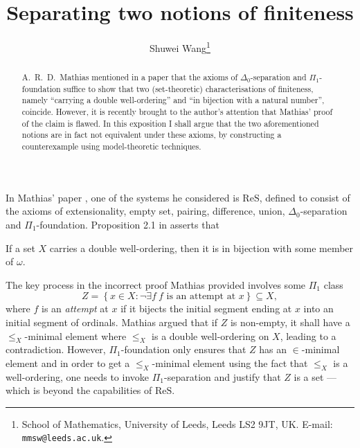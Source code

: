 \documentclass[11pt]{article}
\title{Separating two notions of finiteness}
\author{Shuwei Wang\footnote{School of Mathematics, University of Leeds, Leeds LS2 9JT, UK. E-mail: \texttt{mmsw@leeds.ac.uk}.}}
\date{\DTMdate{2023-10-25}}
\theoremstyle{plain}
\theoremstyle{definition}
\newcommand{\ReS}{\mathrm{ReS}}
\begin{document}
\maketitle

\begin{abstract}
  A.\ R.\ D.\ Mathias mentioned in a paper that the axioms of $\Delta_0$-separation and $\Pi_1$-foundation suffice to show that two (set-theoretic) characterisations of finiteness, namely ``carrying a double well-ordering'' and ``in bijection with a natural number'', coincide. However, it is recently brought to the author's attention that Mathias' proof of the claim is flawed. In this exposition I shall argue that the two aforementioned notions are in fact not equivalent under these axioms, by constructing a counterexample using model-theoretic techniques.
\end{abstract}

In Mathias' paper \cite{mathias06-weak-systems}, one of the systems he considered is $\ReS$, defined to consist of the axioms of extensionality, empty set, pairing, difference, union, $\Delta_0$-separation and $\Pi_1$-foundation. Proposition 2.1 in \cite{mathias06-weak-systems} asserts that

\begin{claim}[$\ReS$]
  \label{claim:finite-equivalence}
  If a set $X$ carries a double well-ordering, then it is in bijection with some member of $\omega$.
\end{claim}

The key process in the incorrect proof Mathias provided involves some $\Pi_1$ class
\[Z = \left\{x \in X : \neg \exists f \ \text{$f$ is an attempt at $x$}\right\} \subseteq X,\]
where $f$ is an \emph{attempt} at $x$ if it bijects the initial segment ending at $x$ into an initial segment of ordinals. Mathias argued that if $Z$ is non-empty, it shall have a $\leq_X$-minimal element where $\leq_X$ is a double well-ordering on $X$, leading to a contradiction. However, $\Pi_1$-foundation only ensures that $Z$ has an $\in$-minimal element and in order to get a $\leq_X$-minimal element using the fact that $\leq_X$ is a well-ordering, one needs to invoke $\Pi_1$-separation and justify that $Z$ is a set --- which is beyond the capabilities of $\ReS$.
\end{document}
